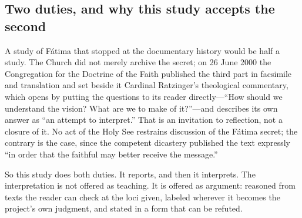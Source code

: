 \subsection{Two duties, and why this study accepts the second}

A study of F\'atima that stopped at the documentary history would be
half a study. The Church did not merely archive the secret; on
26 June 2000 the Congregation for the Doctrine of the Faith published
the third part in facsimile and translation and set beside it Cardinal
Ratzinger's theological commentary, which opens by putting the
questions to its reader directly---``How should we understand the
vision? What are we to make of it?''---and describes its own answer as
``an attempt to interpret.'' That is an invitation to reflection, not
a closure of it. No act of the Holy See restrains discussion of the
F\'atima secret; the contrary is the case, since the competent
dicastery published the text expressly ``in order that the faithful
may better receive the message.''

So this study does both duties. It reports, and then it interprets.
The interpretation is not offered as teaching. It is offered as
argument: reasoned from texts the reader can check at the loci given,
labeled wherever it becomes the project's own judgment, and stated in
a form that can be refuted.

